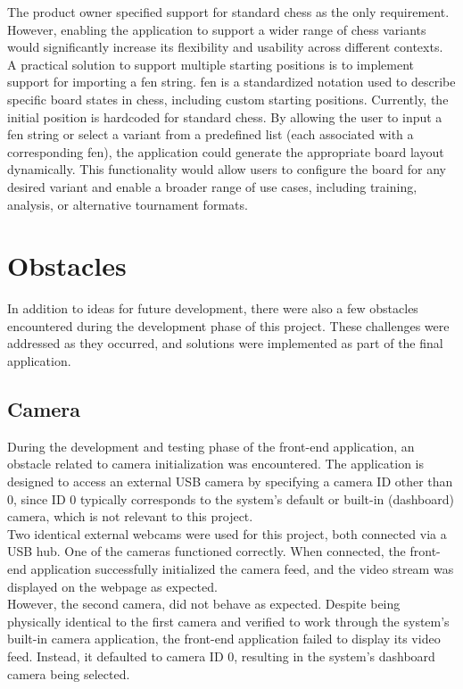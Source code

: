The product owner specified support for standard chess as the only requirement. However, enabling the application to support a wider range of chess variants would significantly increase its flexibility and usability across different contexts. \\

A practical solution to support multiple starting positions is to implement support for importing a \gls{fen} string. \gls{fen} is a standardized notation used to describe specific board states in chess, including custom starting positions. Currently, the initial position is hardcoded for standard chess. By allowing the user to input a \gls{fen} string or select a variant from a predefined list (each associated with a corresponding \gls{fen}), the application could generate the appropriate board layout dynamically. This functionality would allow users to configure the board for any desired variant and enable a broader range of use cases, including training, analysis, or alternative tournament formats.

\section{Obstacles}
In addition to ideas for future development, there were also a few obstacles encountered during the development phase of this project. These challenges were addressed as they occurred, and solutions were implemented as part of the final application.

\subsection{Camera}
During the development and testing phase of the front-end application, an obstacle related to camera initialization was encountered. The application is designed to access an external USB camera by specifying a camera ID other than 0, since ID 0 typically corresponds to the system's default or built-in (dashboard) camera, which is not relevant to this project.\\

Two identical external webcams were used for this project, both connected via a USB hub. One of the cameras functioned correctly. When connected, the front-end application successfully initialized the camera feed, and the video stream was displayed on the webpage as expected.\\

However, the second camera, did not behave as expected. Despite being physically identical to the first camera and verified to work through the system's built-in camera application, the front-end application failed to display its video feed. Instead, it defaulted to camera ID 0, resulting in the system's dashboard camera being selected.\\

